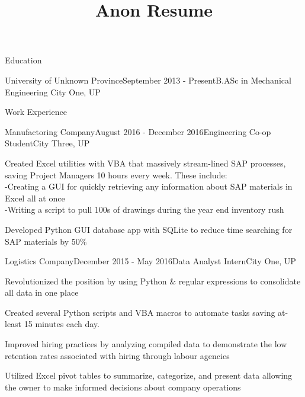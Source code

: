 \documentclass{resume} %
\begin{document}
\title{Anon Resume}

\begin{rSection}{Education}

\begin{rSubsection}{University of Unknown Province}{September 2013 - Present}{B.ASc in Mechanical Engineering }{City One, UP}
\vspace{-.65cm}
\item[]
\end{rSubsection}
\end{rSection}


\begin{rSection}{Work Experience}
\begin{rSubsection}{Manufactoring Company}{August 2016 - December 2016}{Engineering Co-op Student}{City Three, UP}
\item Created Excel utilities with VBA that massively stream-lined SAP processes, saving Project Managers 10 hours every week. These include: \\
-Creating a GUI for quickly retrieving any information about SAP materials in Excel all at once\\
-Writing a script to pull 100s of drawings during the year end inventory rush
\item Developed Python GUI database app with SQLite to reduce time searching for SAP materials by 50\%
\end{rSubsection}
\begin{rSubsection}{Logistics Company}{December 2015 - May 2016}{Data Analyst Intern}{City One, UP}
\item Revolutionized the position by using Python \& regular expressions to consolidate all data in one place
\item Created several Python scripts and VBA macros to automate tasks saving at-least 15 minutes each day.
\item Improved hiring practices by analyzing compiled data to demonstrate the low retention rates associated with hiring through labour agencies
\item Utilized Excel pivot tables to summarize, categorize, and present data allowing the owner to make informed decisions about company operations
\end{rSubsection}
\end{rSection}
\end{document}
